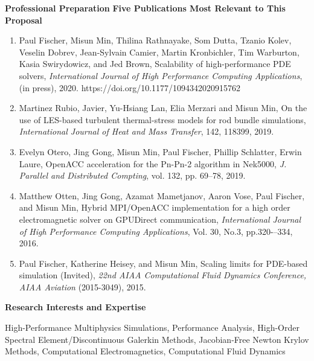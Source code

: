 \documentclass[11pt,letterpaper,english]{article}
\begin{document}
\begin{flushleft} {\bf Professional Preparation}
\vspace{.04in}
{\bf Five Publications Most Relevant to This Proposal}
\vspace{-6pt}
\begin{enumerate} \itemsep1pt \parskip0pt 
\item Paul Fischer, Misun Min, Thilina Rathnayake, Som Dutta, Tzanio Kolev, Veselin
  Dobrev, Jean-Sylvain Camier, Martin Kronbichler, Tim Warburton, Kasia
  Swirydowicz, and Jed Brown, Scalability of high-performance PDE solvers,
  \textit{International Journal of High Performance Computing Applications}, (in press), 2020.
   https://doi.org/10.1177/1094342020915762\\
\item Martinez Rubio, Javier, Yu-Hsiang Lan, Elia Merzari and Misun Min,
On the use of LES-based turbulent thermal-stress models for rod bundle simulations,
\textit{International Journal of Heat and Mass Transfer},
142, 118399, 2019. \\
\item
Evelyn Otero, Jing Gong, Misun Min, Paul Fischer, Phillip Schlatter, Erwin Laure,
OpenACC acceleration for the Pn-Pn-2 algorithm in Nek5000,
\textit{J. Parallel and Distributed Compting}, vol. 132, pp. 69--78, 2019.  \\
\item Matthew Otten, Jing Gong, Azamat Mametjanov, Aaron Vose, Paul Fischer, and Misun Min,
Hybrid MPI/OpenACC implementation for a high order electromagnetic solver on GPUDirect communication,
\textit{International Journal of High Performance Computing Applications}, Vol. 30, No.3, pp.320-–334, 2016.\\
\item Paul Fischer, Katherine Heisey, and Misun Min, Scaling limits for PDE-based simulation (Invited),
\textit{22nd AIAA Computational Fluid Dynamics Conference, AIAA Aviation} (2015-3049), 2015.
\end{enumerate}

\vspace{-6pt}
{\bf Research Interests and Expertise}
{\parindent 16pt

High-Performance Multiphysics Simulations,
Performance Analysis,
High-Order Spectral Element/Discontinuous Galerkin Methods,
Jacobian-Free Newton Krylov Methods,
Computational Electromagnetics, Computational Fluid Dynamics
}


\end{flushleft}
\end{document}
